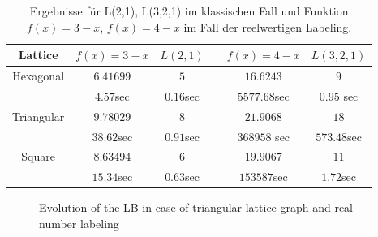 \documentclass[
	fontsize=12pt,
	paper=a4,
	twoside=false,
	numbers=noenddot,
	plainheadsepline,
	toc=listof,
	toc=bibliography
]{scrartcl}
\begin{document}
\begin{table}[htbp]
\centering
\begin{tabular}{|c|c|c|c|c|c|}
\hline 
	Lattice   & $ f(x)=3-x$  & $L(2,1)$   & & $f(x)=4-x$    & $L(3,2,1)$  \\ \hline 
	
	Hexagonal & $6.41699$	  & $5$        & & $16.6243$     & $9$         \\ 
			  & $4.57$sec     & $0.16$sec  & & $5577.68$sec  & $0.95$ sec   \\ \hline

	Triangular& $9.78029$ 	  & $8$         & & $21.9068$     & $18$         \\ 
			  & $38.62$sec    & $0.91$sec   & & $368958$ sec  & $573.48$sec  \\ \hline
			  
	Square    & $8.63494$	  & $6$         & & $19.9067$     & $11$   \\ 
			  & $15.34$sec    & $0.63$sec  & & $153587$sec    & $1.72$sec \\ \hline
\end{tabular}
\caption{ Ergebnisse für L(2,1), L(3,2,1) im klassischen Fall und Funktion $f(x)=3-x$, $f(x)=4-x$ im Fall der
	reelwertigen Labeling.} 
\label{Table:T1}
\end{table}

\FloatBarrier	

\begin{figure}[hb]
\caption{Evolution of the LB in case of triangular lattice graph and real number labeling}
\end{figure} 
\end{document}
